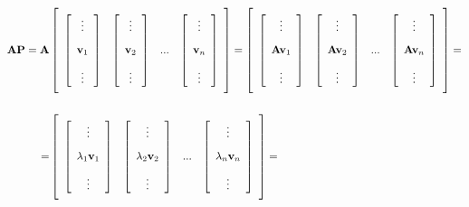 \begin{align}
	\mathbf{AP} = \mathbf{A}& \left[\raisebox{15mm}{} \begin{array}{cccc} \left[\begin{array}{c} \vdots \\[3mm] \mathbf{v}_1 \\[3mm] \vdots \end{array}\right] & \left[\begin{array}{c} \vdots \\[3mm] \mathbf{v}_2 \\[3mm] \vdots \end{array}\right] & ... & \left[\begin{array}{c} \vdots \\[3mm] \mathbf{v}_n \\[3mm] \vdots \end{array}\right] \end{array}\right] = \left[\raisebox{15mm}{} \begin{array}{cccc} \left[\begin{array}{c} \vdots \\[3mm] \mathbf{A}\mathbf{v}_1 \\[3mm] \vdots \end{array}\right] & \left[\begin{array}{c} \vdots \\[3mm] \mathbf{A}\mathbf{v}_2 \\[3mm] \vdots \end{array}\right] & ... & \left[\begin{array}{c} \vdots \\[3mm] \mathbf{A}\mathbf{v}_n \\[3mm] \vdots \end{array}\right] \end{array}\right] = \nonumber\\[5mm]
%
	= &\left[\raisebox{15mm}{} \begin{array}{cccc} \left[\begin{array}{c} \vdots \\[3mm] \lambda_1\mathbf{v}_1 \\[3mm] \vdots \end{array}\right] & \left[\begin{array}{c} \vdots \\[3mm] \lambda_2\mathbf{v}_2 \\[3mm] \vdots \end{array}\right] & ... & \left[\begin{array}{c} \vdots \\[3mm] \lambda_n\mathbf{v}_n \\[3mm] \vdots \end{array}\right] \end{array}\right] = \nonumber\\[5mm]

\end{align}
